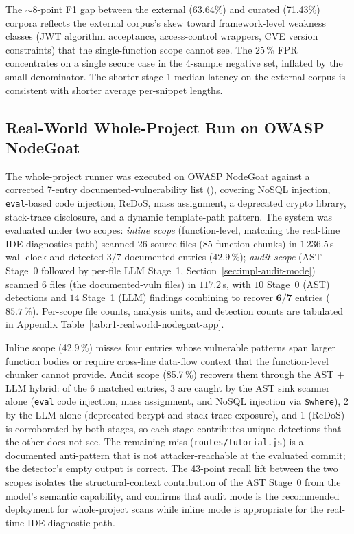 The $\sim$8-point F1 gap between the external (63.64\%) and curated (71.43\%) corpora reflects the external corpus's skew toward framework-level weakness classes (JWT algorithm acceptance, access-control wrappers, CVE version constraints) that the single-function scope cannot see. The 25\,\% FPR concentrates on a single secure case in the 4-sample negative set, inflated by the small denominator. The shorter stage-1 median latency on the external corpus is consistent with shorter average per-snippet lengths.

\subsection{Real-World Whole-Project Run on OWASP NodeGoat}
\label{sec:eval-r1-realworld}

The whole-project runner was executed on OWASP NodeGoat against a corrected 7-entry documented-vulnerability list (), covering NoSQL injection, \texttt{eval}-based code injection, ReDoS, mass assignment, a deprecated crypto library, stack-trace disclosure, and a dynamic template-path pattern. The system was evaluated under two scopes: \emph{inline scope} (function-level, matching the real-time IDE diagnostics path) scanned 26 source files (85 function chunks) in $1\,236.5$\,s wall-clock and detected $3 / 7$ documented entries ($42.9\,\%$); \emph{audit scope} (AST Stage~0 followed by per-file LLM Stage~1, Section~\ref{sec:impl-audit-mode}) scanned 6 files (the documented-vuln files) in $117.2$\,s, with $10$ Stage~0 (AST) detections and $14$ Stage~1 (LLM) findings combining to recover $\mathbf{6 / 7}$ entries ($\mathbf{85.7\,\%}$). Per-scope file counts, analysis units, and detection counts are tabulated in Appendix Table~\ref{tab:r1-realworld-nodegoat-app}.

Inline scope (42.9\,\%) misses four entries whose vulnerable patterns span larger function bodies or require cross-line data-flow context that the function-level chunker cannot provide. Audit scope (85.7\,\%) recovers them through the AST + LLM hybrid: of the 6 matched entries, 3 are caught by the AST sink scanner alone (\texttt{eval} code injection, mass assignment, and NoSQL injection via \texttt{\$where}), 2 by the LLM alone (deprecated bcrypt and stack-trace exposure), and 1 (ReDoS) is corroborated by both stages, so each stage contributes unique detections that the other does not see. The remaining miss (\texttt{routes/tutorial.js}) is a documented anti-pattern that is not attacker-reachable at the evaluated commit; the detector's empty output is correct. The 43-point recall lift between the two scopes isolates the structural-context contribution of the AST Stage~0 from the model's semantic capability, and confirms that audit mode is the recommended deployment for whole-project scans while inline mode is appropriate for the real-time IDE diagnostic path.

